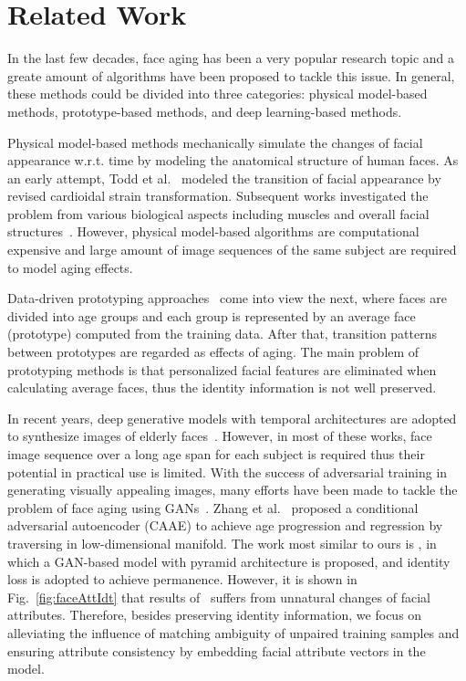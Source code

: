 \documentclass[10pt,twocolumn,letterpaper]{article}
\begin{document}
\section{Related Work}
In the last few decades, face aging has been a very popular research topic and a greate amount of algorithms have been proposed to tackle this issue. 
In general, these methods could be divided into three categories: physical model-based methods, prototype-based methods, and deep learning-based methods.

Physical model-based methods mechanically simulate the changes of facial appearance w.r.t. time by modeling the anatomical structure of human faces. 
As an early attempt, Todd et al.~\cite{todd1980perception} modeled the transition of facial appearance by revised cardioidal strain transformation. 
Subsequent works investigated the problem from various biological aspects including muscles and overall facial structures~\cite{lanitis2002toward,tazoe2012facial}. However, physical model-based algorithms are computational expensive and large amount of image sequences of the same subject are required to model aging effects.

Data-driven prototyping approaches~\cite{suo2010compositional,tiddeman2001prototyping,kemelmacher2014illumination} come into view the next, where faces are divided into age groups and each group is represented by an average face (prototype) computed from the training data. After that, transition patterns between prototypes are regarded as effects of aging. 
The main problem of prototyping methods is that personalized facial features are eliminated when calculating average faces, thus the identity information is not well preserved. 

In recent years, deep generative models with temporal architectures are adopted to synthesize images of elderly faces~\cite{wang2016recurrent,duong2016longitudinal,duong2017temporal}. However, in most of these works, face image sequence over a long age span for each subject is required thus their potential in practical use is limited. 
With the success of adversarial training in generating visually appealing images, many efforts have been made to tackle the problem of face aging using GANs~\cite{goodfellow2014generative}. Zhang et al.~\cite{zhang2017age} proposed a conditional adversarial autoencoder (CAAE) to achieve age progression and regression by traversing in low-dimensional manifold. 
The work most similar to ours is \cite{yang2017learning}, in which a GAN-based model with pyramid architecture is proposed, and identity loss is adopted to achieve permanence. 
However, it is shown in Fig.~\ref{fig:faceAttIdt} that results of~\cite{yang2017learning} suffers from unnatural changes of facial attributes.
Therefore, besides preserving identity information, we focus on alleviating the influence of matching ambiguity of unpaired training samples and ensuring attribute consistency by embedding facial attribute vectors in the model.
\end{document}
